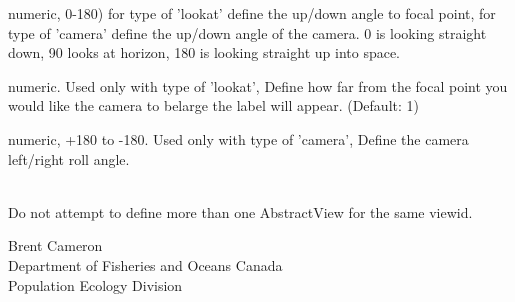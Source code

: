 \documentclass[a4paper]{book}
\begin{document}
\begin{Arguments}
\begin{ldescription}
\item[\code{tilt}] numeric, 0-180) for type of 'lookat' define the up/down angle to focal point, for type of 'camera' define the up/down angle of the camera. 0 is looking straight down, 90 looks at horizon, 180 is looking straight up into space.

\item[\code{range}] numeric. Used only with type of 'lookat', Define how far from the focal point you would like the camera to belarge the label will appear. (Default: 1)
\item[\code{roll}] numeric, +180 to -180. Used only with type of 'camera', Define the camera left/right roll angle. 

\end{ldescription}
\end{Arguments}
%
\begin{Note}\relax
{}\\{}
Do not attempt to define more than one AbstractView for the same viewid.

\end{Note}
%
\begin{Author}\relax
Brent Cameron\\{}
Department of Fisheries and Oceans Canada\\{}
Population Ecology Division
\end{Author}
%
\begin{References}\relax
{}\\{}
\\{}

\end{References}
%
\end{document}
